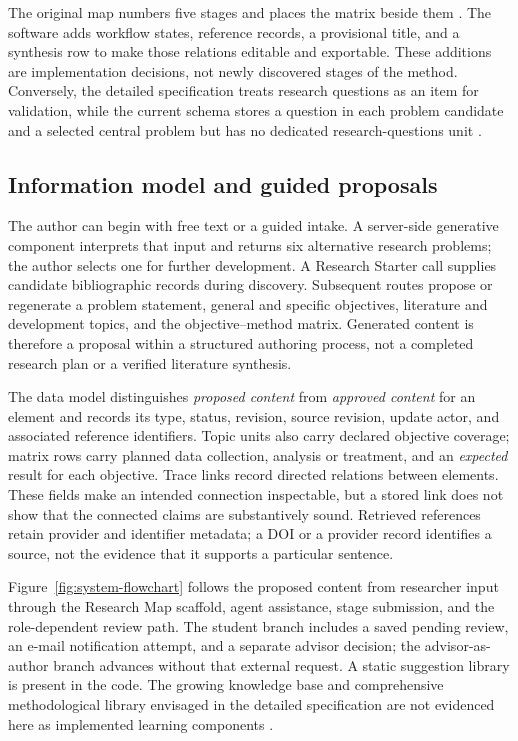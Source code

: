 The original map numbers five stages and places the matrix beside them \cite{franca2026map}. The software adds workflow states, reference records, a provisional title, and a synthesis row to make those relations editable and exportable. These additions are implementation decisions, not newly discovered stages of the method. Conversely, the detailed specification treats research questions as an item for validation, while the current schema stores a question in each problem candidate and a selected central problem but has no dedicated research-questions unit \cite{franca2026detail}.

\subsection{Information model and guided proposals}

The author can begin with free text or a guided intake. A server-side generative component interprets that input and returns six alternative research problems; the author selects one for further development. A Research Starter call supplies candidate bibliographic records during discovery. Subsequent routes propose or regenerate a problem statement, general and specific objectives, literature and development topics, and the objective--method matrix. Generated content is therefore a proposal within a structured authoring process, not a completed research plan or a verified literature synthesis.

The data model distinguishes \emph{proposed content} from \emph{approved content} for an element and records its type, status, revision, source revision, update actor, and associated reference identifiers. Topic units also carry declared objective coverage; matrix rows carry planned data collection, analysis or treatment, and an \emph{expected} result for each objective. Trace links record directed relations between elements. These fields make an intended connection inspectable, but a stored link does not show that the connected claims are substantively sound. Retrieved references retain provider and identifier metadata; a DOI or a provider record identifies a source, not the evidence that it supports a particular sentence.

Figure~\ref{fig:system-flowchart} follows the proposed content from researcher input through the Research Map scaffold, agent assistance, stage submission, and the role-dependent review path. The student branch includes a saved pending review, an e-mail notification attempt, and a separate advisor decision; the advisor-as-author branch advances without that external request. A static suggestion library is present in the code. The growing knowledge base and comprehensive methodological library envisaged in the detailed specification are not evidenced here as implemented learning components \cite{franca2026detail}.

